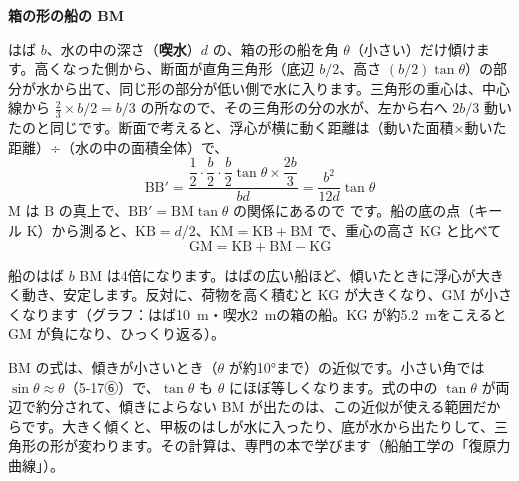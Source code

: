 \noindent\textbf{箱の形の船の BM}\par\nobreak
\label{ph:力-12:bm}はば $b$、水の中の深さ（\textbf{喫水}）$d$ の、箱の形の船を角 $\theta$（小さい）だけ傾けます。高くなった側から、断面が直角三角形（底辺 $b/2$、高さ $(b/2)\tan\theta$）の部分が水から出て、同じ形の部分が低い側で水に入ります。三角形の重心は、中心線から $\tfrac{2}{3}\times b/2=b/3$ の所なので、その三角形の分の水が、左から右へ $2b/3$ 動いたのと同じです。断面で考えると、浮心が横に動く距離は（動いた面積×動いた距離）÷（水の中の面積全体）で、
\[ \mathrm{BB'}=\frac{\dfrac{1}{2}\cdot\dfrac{b}{2}\cdot\dfrac{b}{2}\tan\theta\times\dfrac{2b}{3}}{bd}=\frac{b^2}{12d}\tan\theta \]
M は B の真上で、$\mathrm{BB'}=\mathrm{BM}\tan\theta$ の関係にあるので
です。船の底の点（キール K）から測ると、$\mathrm{KB}=d/2$、$\mathrm{KM}=\mathrm{KB}+\mathrm{BM}$ で、重心の高さ KG と比べて
\[ \mathrm{GM}=\mathrm{KB}+\mathrm{BM}-\mathrm{KG} \]
\begin{phbaisuru}{船のはば $b$}
BM は4倍になります。はばの広い船ほど、傾いたときに浮心が大きく動き、安定します。反対に、荷物を高く積むと KG が大きくなり、GM が小さくなります（グラフ：はば\qty{10}{m}・喫水\qty{2}{m}の箱の船。KG が約\qty{5.2}{m}をこえると GM が負になり、ひっくり返る）。
\par\vspace{2pt}\centering
{}
\end{phbaisuru}
\begin{seikaku}
BM の式は、傾きが小さいとき（$\theta$ が約10°まで）の近似です。小さい角では $\sin\theta\approx\theta$（5-17⑥）で、$\tan\theta$ も $\theta$ にほぼ等しくなります。式の中の $\tan\theta$ が両辺で約分されて、傾きによらない BM が出たのは、この近似が使える範囲だからです。大きく傾くと、甲板のはしが水に入ったり、底が水から出たりして、三角形の形が変わります。その計算は、専門の本で学びます（船舶工学の「復原力曲線」）。
\end{seikaku}

